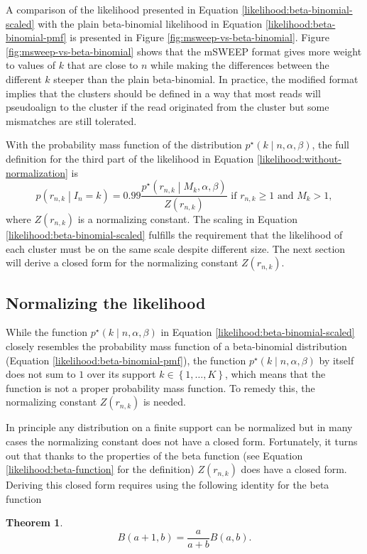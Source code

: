 \documentclass[officiallayout]{tktla}
\newtheorem{theorem}{Theorem}[chapter]
\begin{document}
A comparison of the likelihood presented in Equation
\eqref{likelihood:beta-binomial-scaled} with the plain beta-binomial
likelihood in Equation \eqref{likelihood:beta-binomial-pmf} is presented
in Figure \ref{fig:msweep-vs-beta-binomial}. Figure
\ref{fig:msweep-vs-beta-binomial} shows that the mSWEEP format gives
more weight to values of $k$ that are close to $n$ while making the
differences between the different $k$ steeper than the plain
beta-binomial. In practice, the modified format implies that the
clusters should be defined in a way that most reads will pseudoalign
to the cluster if the read originated from the cluster but some
mismatches are still tolerated.

With the probability mass function of the distribution
$p^{\star}\left(k \middle| n, \alpha, \beta\right)$, the full
definition for the third part of the likelihood in Equation \eqref{likelihood:without-normalization} is
\begin{equation}
  \label{likelihood:normalized}
  p\left(r_{n, k} \middle| I_{n} = k\right) = 0.99\frac{p^{\star}\left(r_{n, k} \middle| M_{k}, \alpha, \beta\right)}{Z\left(r_{n, k}\right)}\text{ if } r_{n, k} \geq 1\text{ and } M_{k} > 1,
\end{equation}
where $Z\left(r_{n, k}\right)$ is a normalizing constant. The scaling
in Equation \eqref{likelihood:beta-binomial-scaled} fulfills the
requirement that the likelihood of each cluster must be on the same
scale despite different size. The next section will derive a closed
form for the normalizing constant $Z\left(r_{n, k}\right)$.

\subsection{Normalizing the likelihood}

While the function $p^{\star}\left(k \middle| n, \alpha, \beta\right)$
in Equation \eqref{likelihood:beta-binomial-scaled} closely resembles
the probability mass function of a beta-binomial distribution
(Equation \eqref{likelihood:beta-binomial-pmf}), the function
$p^{\star}\left(k \middle| n, \alpha, \beta\right)$ by itself does not
sum to $1$ over its support $k \in \left\{ 1, \dots, K \right\}$,
which means that the function is not a proper probability mass
function. To remedy this, the normalizing constant $Z\left(r_{n,
  k}\right)$ is needed.

In principle any distribution on a finite support can be normalized
but in many cases the normalizing constant does not have a closed
form. Fortunately, it turns out that \textemdash{ } thanks to the
properties of the beta function (see Equation
\eqref{likelihood:beta-function} for the definition) \textemdash{ }
$Z\left(r_{n, k}\right)$ does have a closed form. Deriving this closed
form requires using the following identity for the beta function
\begin{theorem}
  \label{lemma:beta-function-identity}
  \[
  B\left(a + 1, b\right) = \frac{a}{a + b}B\left(a, b\right).
  \]
\end{theorem}
\end{document}
